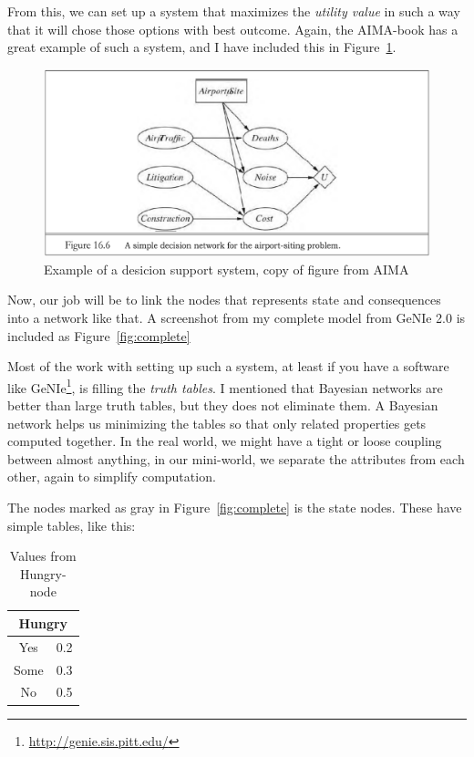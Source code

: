 From this, we can set up a system that maximizes the \emph{utility
value}\cite{aima} in such a way that it will chose those options with best
outcome. Again, the AIMA-book has a great example of such a system, and I have
included this in Figure~\ref{fig:dssExample}.
\begin{figure}[h]
\includegraphics[width=122mm]{figure-example2.png}
\caption{Example of a desicion support system, copy of figure from
AIMA\cite{aima}}
\label{fig:dssExample}
\end{figure}

Now, our job will be to link the nodes that represents state and consequences
into a network like that. A screenshot from my complete model from GeNIe 2.0
is included as Figure~\ref{fig:complete}

Most of the work with setting up such a system, at least if you have a software
like GeNIe\footnote{\url{http://genie.sis.pitt.edu/}}, is filling the
\emph{truth tables}. I mentioned that Bayesian networks are better than large
truth tables, but they does not eliminate them. A Bayesian network helps us minimizing the tables so that only related
properties gets computed together. In the real world, we might have a tight or
loose coupling between almost anything, in our mini-world, we separate the
attributes from each other, again to simplify computation.


The nodes marked as gray in Figure~\ref{fig:complete} is the state nodes. These
have simple tables, like this:
\begin{table}[h!!!!!!!!!!]
\begin{tabular}{|c|c|}
\hline
\multicolumn{2}{|c|}{Hungry}\\
\hline
Yes & 0.2\\
Some & 0.3\\
No & 0.5\\
\hline
\end{tabular}
\caption{Values from Hungry-node}
\label{tab:hungry}
\end{table}

